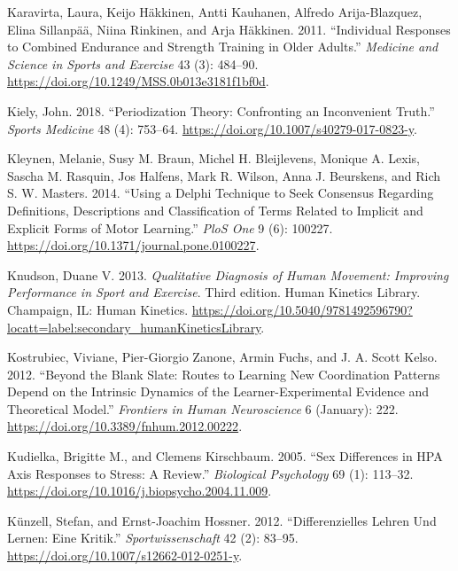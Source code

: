 \documentclass[
  letterpaper,
  DIV=11,
  numbers=noendperiod]{scrreprt}
\newlength{\cslhangindent}
\newenvironment{CSLReferences}[2] %
 {\begin{list}{}{%
  \setlength{\itemindent}{0pt}
  \setlength{\leftmargin}{0pt}
  \setlength{\parsep}{0pt}
  \ifodd #1
   \setlength{\leftmargin}{\cslhangindent}
   \setlength{\itemindent}{-1\cslhangindent}
  \fi
  \setlength{\itemsep}{#2\baselineskip}}}
 {\end{list}}
\begin{document}
\begin{CSLReferences}{1}{0}
Karavirta, Laura, Keijo Häkkinen, Antti Kauhanen, Alfredo
Arija-Blazquez, Elina Sillanpää, Niina Rinkinen, and Arja Häkkinen.
2011. {``Individual Responses to Combined Endurance and Strength
Training in Older Adults.''} \emph{Medicine and Science in Sports and
Exercise} 43 (3): 484--90.
\url{https://doi.org/10.1249/MSS.0b013e3181f1bf0d}.

Kiely, John. 2018. {``Periodization {Theory}: {Confronting} an
{Inconvenient Truth}.''} \emph{Sports Medicine} 48 (4): 753--64.
\url{https://doi.org/10.1007/s40279-017-0823-y}.

Kleynen, Melanie, Susy M. Braun, Michel H. Bleijlevens, Monique A.
Lexis, Sascha M. Rasquin, Jos Halfens, Mark R. Wilson, Anna J.
Beurskens, and Rich S. W. Masters. 2014. {``Using a {Delphi} Technique
to Seek Consensus Regarding Definitions, Descriptions and Classification
of Terms Related to Implicit and Explicit Forms of Motor Learning.''}
\emph{PloS One} 9 (6): 100227.
\url{https://doi.org/10.1371/journal.pone.0100227}.

Knudson, Duane V. 2013. \emph{Qualitative Diagnosis of Human Movement:
{Improving} Performance in Sport and Exercise}. Third edition. Human
{Kinetics Library}. Champaign, IL: Human Kinetics.
\url{https://doi.org/10.5040/9781492596790?locatt=label:secondary_humanKineticsLibrary}.

Kostrubiec, Viviane, Pier-Giorgio Zanone, Armin Fuchs, and J. A. Scott
Kelso. 2012. {``Beyond the Blank Slate: Routes to Learning New
Coordination Patterns Depend on the Intrinsic Dynamics of the
Learner-Experimental Evidence and Theoretical Model.''} \emph{Frontiers
in Human Neuroscience} 6 (January): 222.
\url{https://doi.org/10.3389/fnhum.2012.00222}.

Kudielka, Brigitte M., and Clemens Kirschbaum. 2005. {``Sex Differences
in {HPA} Axis Responses to Stress: A Review.''} \emph{Biological
Psychology} 69 (1): 113--32.
\url{https://doi.org/10.1016/j.biopsycho.2004.11.009}.

Künzell, Stefan, and Ernst-Joachim Hossner. 2012. {``Differenzielles
{Lehren} Und {Lernen}: Eine {Kritik}.''} \emph{Sportwissenschaft} 42
(2): 83--95. \url{https://doi.org/10.1007/s12662-012-0251-y}.


\end{CSLReferences}
\end{document}
